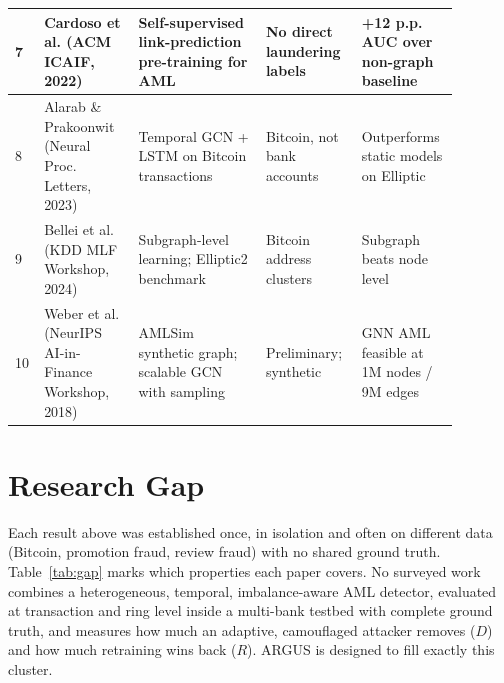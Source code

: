 {\begin{longtable}{|p{0.04\linewidth}|p{0.20\linewidth}|p{0.27\linewidth}|p{0.20\linewidth}|p{0.17\linewidth}|}
7 & Cardoso et al. \cite{cardoso2022laundrograph} (ACM ICAIF, 2022) & Self-supervised link-prediction pre-training for AML & No direct laundering labels & +12 p.p. AUC over non-graph baseline \\ \hline
8 & Alarab \& Prakoonwit \cite{alarab2023graph} (Neural Proc. Letters, 2023) & Temporal GCN + LSTM on Bitcoin transactions & Bitcoin, not bank accounts & Outperforms static models on Elliptic \\ \hline
9 & Bellei et al. \cite{bellei2024shape} (KDD MLF Workshop, 2024) & Subgraph-level learning; Elliptic2 benchmark & Bitcoin address clusters & Subgraph beats node level \\ \hline
10 & Weber et al. \cite{weber2018scalable} (NeurIPS AI-in-Finance Workshop, 2018) & AMLSim synthetic graph; scalable GCN with sampling & Preliminary; synthetic & GNN AML feasible at 1M nodes / 9M edges \\ \hline
\end{longtable}
}

\section{Research Gap}
Each result above was established once, in isolation and often on different data (Bitcoin, promotion fraud, review fraud) with no shared ground truth. Table~\ref{tab:gap} marks which properties each paper covers. No surveyed work combines a heterogeneous, temporal, imbalance-aware AML detector, evaluated at transaction and ring level inside a multi-bank testbed with complete ground truth, and measures how much an adaptive, camouflaged attacker removes ($D$) and how much retraining wins back ($R$). ARGUS is designed to fill exactly this cluster.

